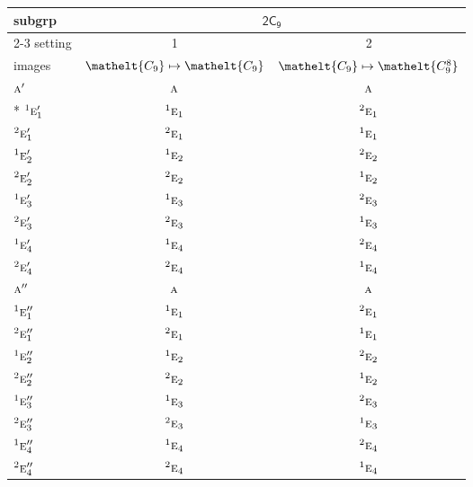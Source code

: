 \documentclass[10pt,a4paper]{article}
\numberwithin{equation}{section}
\newcommand{\eltfont}[1]{{\let\sigma\eltsigma\mathelt{#1}}}
\newcommand{\grp}[1]{\mathsf{#1}}
\newcommand{\irr}[1]{\text{\normalfont\scshape #1}}
\newcommand{\conjpair}[1]{{}^{#1}}
\newcommand{\cls}[1]{\eltfont{#1}}
\begin{document}
{\small\begin{longtable}{@{}lcc@{}}\toprule
subgrp & \multicolumn{2}{c}{\href{2C9.pdf}{$\grp{2C_{9}}$}}\\\cmidrule(lr){2-3}
setting & 1 & 2\\
images & {\scriptsize $\cls{C_{9}} \mapsto \cls{C_{9}}$} & {\scriptsize $\cls{C_{9}} \mapsto \cls{C_{9}^{8}}$}\\\midrule\endhead
\bottomrule\endfoot\endlastfoot
$\irr{a}'$ & $\irr{a}$ & $\irr{a}$\\*
$\conjpair{1}\irr{e}_{1}'$ & $\conjpair{1}\irr{e}_{1}$ & $\conjpair{2}\irr{e}_{1}$\\
$\conjpair{2}\irr{e}_{1}'$ & $\conjpair{2}\irr{e}_{1}$ & $\conjpair{1}\irr{e}_{1}$\\
$\conjpair{1}\irr{e}_{2}'$ & $\conjpair{1}\irr{e}_{2}$ & $\conjpair{2}\irr{e}_{2}$\\
$\conjpair{2}\irr{e}_{2}'$ & $\conjpair{2}\irr{e}_{2}$ & $\conjpair{1}\irr{e}_{2}$\\
$\conjpair{1}\irr{e}_{3}'$ & $\conjpair{1}\irr{e}_{3}$ & $\conjpair{2}\irr{e}_{3}$\\
$\conjpair{2}\irr{e}_{3}'$ & $\conjpair{2}\irr{e}_{3}$ & $\conjpair{1}\irr{e}_{3}$\\
$\conjpair{1}\irr{e}_{4}'$ & $\conjpair{1}\irr{e}_{4}$ & $\conjpair{2}\irr{e}_{4}$\\
$\conjpair{2}\irr{e}_{4}'$ & $\conjpair{2}\irr{e}_{4}$ & $\conjpair{1}\irr{e}_{4}$\\
$\irr{a}''$ & $\irr{a}$ & $\irr{a}$\\
$\conjpair{1}\irr{e}_{1}''$ & $\conjpair{1}\irr{e}_{1}$ & $\conjpair{2}\irr{e}_{1}$\\
$\conjpair{2}\irr{e}_{1}''$ & $\conjpair{2}\irr{e}_{1}$ & $\conjpair{1}\irr{e}_{1}$\\
$\conjpair{1}\irr{e}_{2}''$ & $\conjpair{1}\irr{e}_{2}$ & $\conjpair{2}\irr{e}_{2}$\\
$\conjpair{2}\irr{e}_{2}''$ & $\conjpair{2}\irr{e}_{2}$ & $\conjpair{1}\irr{e}_{2}$\\
$\conjpair{1}\irr{e}_{3}''$ & $\conjpair{1}\irr{e}_{3}$ & $\conjpair{2}\irr{e}_{3}$\\
$\conjpair{2}\irr{e}_{3}''$ & $\conjpair{2}\irr{e}_{3}$ & $\conjpair{1}\irr{e}_{3}$\\
$\conjpair{1}\irr{e}_{4}''$ & $\conjpair{1}\irr{e}_{4}$ & $\conjpair{2}\irr{e}_{4}$\\
$\conjpair{2}\irr{e}_{4}''$ & $\conjpair{2}\irr{e}_{4}$ & $\conjpair{1}\irr{e}_{4}$\\

\end{longtable}}
\end{document}
